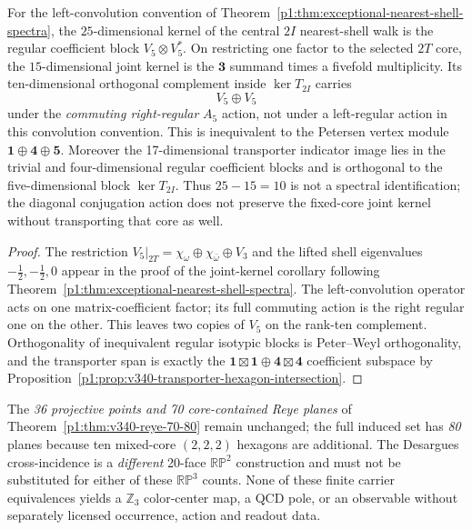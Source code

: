 \documentclass[11pt]{article}
\begin{document}
\begin{proposition}
\label{p1:prop:v341-walk-kernel-no-petersen-isomorphism}
For the left-convolution convention of
Theorem~\ref{p1:thm:exceptional-nearest-shell-spectra}, the
$25$-dimensional kernel of the central $2I$ nearest-shell walk is
the regular coefficient block $V_5\otimes V_5^*$.
On restricting one factor to the selected $2T$ core, the
$15$-dimensional joint kernel is the $\mathbf3$ summand times a
fivefold multiplicity.  Its ten-dimensional orthogonal complement
inside $\ker T_{2I}$ carries
\[
 \boxed{V_5\oplus V_5}
\]
under the \emph{commuting right-regular} $A_5$ action, not under a
left-regular action in this convolution convention.  This is
inequivalent to the Petersen vertex module
$\mathbf1\oplus\mathbf4\oplus\mathbf5$.
Moreover the 17-dimensional transporter indicator image lies in the
trivial and four-dimensional regular coefficient blocks and is
orthogonal to the five-dimensional block $\ker T_{2I}$.
Thus $25-15=10$ is not a spectral identification; the diagonal
conjugation action does not preserve the fixed-core joint kernel
without transporting that core as well.
\end{proposition}
\begin{proof}
The restriction $V_5|_{2T}=\chi_\omega\oplus
\chi_{\bar\omega}\oplus V_3$ and the lifted shell eigenvalues
$-\tfrac12,-\tfrac12,0$ appear in the proof of the joint-kernel
corollary following Theorem~\ref{p1:thm:exceptional-nearest-shell-spectra}.
The left-convolution operator acts on one matrix-coefficient factor;
its full commuting action is the right regular one on the other.
This leaves two copies of $V_5$ on the rank-ten complement.
Orthogonality of inequivalent regular isotypic blocks is
Peter--Weyl orthogonality, and the transporter span is exactly the
$\mathbf1\boxtimes\mathbf1\oplus\mathbf4\boxtimes\mathbf4$
coefficient subspace by
Proposition~\ref{p1:prop:v340-transporter-hexagon-intersection}.
\end{proof}

\begin{remark}
\label{p1:rem:v341-reye-compatibility}
The \emph{36 projective points and 70 core-contained Reye planes}
of Theorem~\ref{p1:thm:v340-reye-70-80} remain unchanged;
the full induced set has \emph{80} planes because ten mixed-core
$(2,2,2)$ hexagons are additional.  The Desargues cross-incidence
is a \emph{different} 20-face $\mathbb{RP}^2$ construction and
must not be substituted for either of these $\mathbb{RP}^3$ counts.
None of these finite carrier equivalences yields a $\mathbb Z_3$
color-center map, a QCD pole, or an observable without separately
licensed occurrence, action and readout data.
\end{remark}
\end{document}
